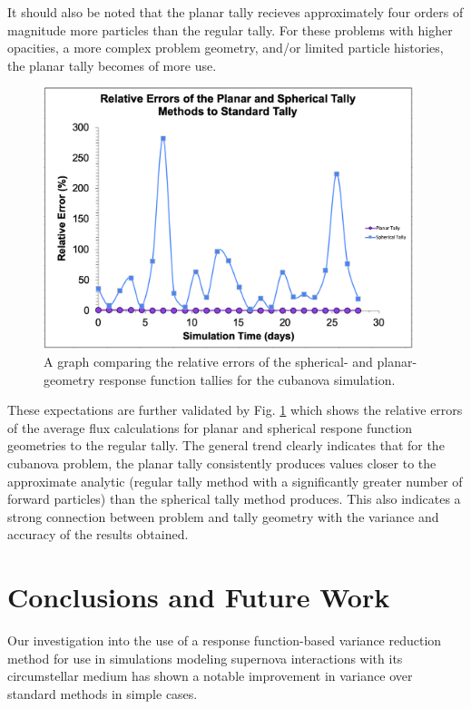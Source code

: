 It should also be noted that the planar tally recieves approximately four orders of magnitude more particles than the regular tally. For these problems with higher opacities, a more complex problem geometry, and/or limited particle histories, the planar tally becomes of more use. 

\begin{figure} [h!]
	\centering
	\includegraphics[height=3in]{VarReduction/plots/relative_errors.png}
	\caption{A graph comparing the relative errors of the spherical- and planar-geometry response function tallies for the cubanova simulation. }
	\label{fig:relative_errors}
\end{figure}

These expectations are further validated by Fig. \ref{fig:relative_errors} which shows the relative errors of the average flux calculations for planar and spherical respone function geometries to the regular tally. The general trend clearly indicates that for the cubanova problem, the planar tally consistently produces values closer to the approximate analytic (regular tally method with a significantly greater number of forward particles) than the spherical tally method produces. This also indicates a strong connection between problem and tally geometry with the variance and accuracy of the results obtained. 

\section{Conclusions and Future Work}
Our investigation into the use of a response function-based variance reduction method for use in simulations modeling supernova interactions with its circumstellar medium has shown a notable improvement in variance over standard methods in simple cases. 

